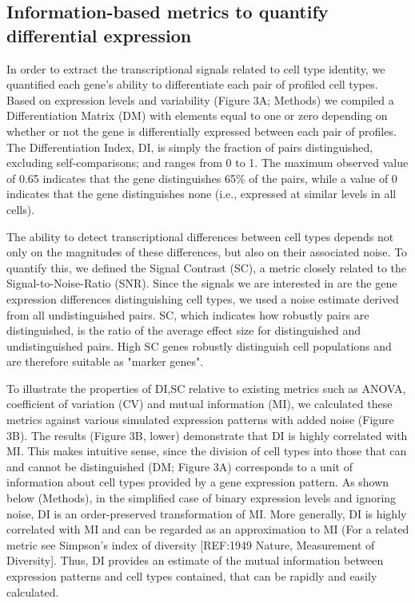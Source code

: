 \subsection{Information-based metrics to quantify differential expression}
In order to extract the transcriptional signals related to cell type identity, we quantified each gene's ability to differentiate each pair of profiled cell types. Based on expression levels and variability (Figure 3A; Methods) we compiled a Differentiation Matrix (DM) with elements equal to one or zero depending on whether or not the gene is differentially expressed between each pair of profiles. The Differentiation Index, DI, is simply the fraction of pairs distinguished, excluding self-comparisons; and ranges from 0 to 1. The maximum observed value of 0.65 indicates that the gene distinguishes 65\% of the pairs, while a value of 0 indicates that the gene distinguishes none (i.e., expressed at similar levels in all cells). 

The ability to detect transcriptional differences between cell types depends not only on the magnitudes of these differences, but also on their associated noise. To quantify this, we defined the Signal Contrast (SC), a metric closely related to the Signal-to-Noise-Ratio (SNR). Since the signals we are interested in are the gene expression differences distinguishing cell types, we used a noise estimate derived from all undistinguished pairs. SC, which indicates how robustly pairs are distinguished, is the ratio of the average effect size for distinguished and undistinguished pairs. High SC genes robustly distinguish cell populations and are therefore suitable as "marker genes".

To illustrate the properties of DI,SC relative to existing metrics such as ANOVA, coefficient of variation (CV) and mutual information (MI), we calculated these metrics against various simulated expression patterns with added noise (Figure 3B). The results (Figure 3B, lower) demonstrate that DI is highly correlated with MI. This makes intuitive sense, since the division of cell types into those that can and cannot be distinguished (DM; Figure 3A) corresponds to a unit of information about cell types provided by a gene expression pattern. As shown below (Methods), in the simplified case of binary expression levels and ignoring noise, DI is an order-preserved transformation of MI. More generally, DI is highly correlated with MI and can be regarded as an approximation to MI (For a related metric see Simpson's index of diversity [REF:1949 Nature, Measurement of Diversity]. Thus, DI provides an estimate of the mutual information between expression patterns and cell types contained, that can be rapidly and easily calculated. 

